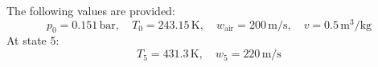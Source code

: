 The following values are provided:  
\[
p_0 = 0.151 \, \text{bar}, \quad T_0 = 243.15 \, \text{K}, \quad w_{\text{air}} = 200 \, \text{m/s}, \quad v = 0.5 \, \text{m}^3/\text{kg}
\]  
At state 5:  
\[
T_5 = 431.3 \, \text{K}, \quad w_5 = 220 \, \text{m/s}
\]